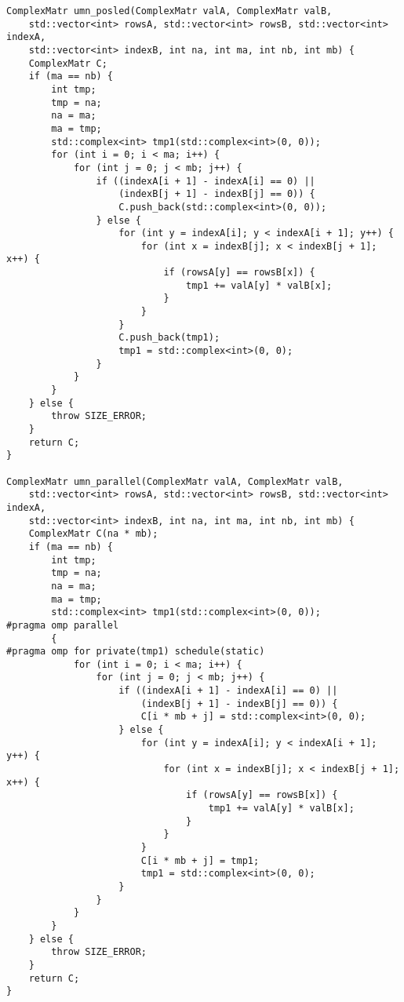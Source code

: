 \documentclass{report}
\begin{document}
\begin{lstlisting}
ComplexMatr umn_posled(ComplexMatr valA, ComplexMatr valB,
    std::vector<int> rowsA, std::vector<int> rowsB, std::vector<int> indexA,
    std::vector<int> indexB, int na, int ma, int nb, int mb) {
    ComplexMatr C;
    if (ma == nb) {
        int tmp;
        tmp = na;
        na = ma;
        ma = tmp;
        std::complex<int> tmp1(std::complex<int>(0, 0));
        for (int i = 0; i < ma; i++) {
            for (int j = 0; j < mb; j++) {
                if ((indexA[i + 1] - indexA[i] == 0) ||
                    (indexB[j + 1] - indexB[j] == 0)) {
                    C.push_back(std::complex<int>(0, 0));
                } else {
                    for (int y = indexA[i]; y < indexA[i + 1]; y++) {
                        for (int x = indexB[j]; x < indexB[j + 1]; x++) {
                            if (rowsA[y] == rowsB[x]) {
                                tmp1 += valA[y] * valB[x];
                            }
                        }
                    }
                    C.push_back(tmp1);
                    tmp1 = std::complex<int>(0, 0);
                }
            }
        }
    } else {
        throw SIZE_ERROR;
    }
    return C;
}

ComplexMatr umn_parallel(ComplexMatr valA, ComplexMatr valB,
    std::vector<int> rowsA, std::vector<int> rowsB, std::vector<int> indexA,
    std::vector<int> indexB, int na, int ma, int nb, int mb) {
    ComplexMatr C(na * mb);
    if (ma == nb) {
        int tmp;
        tmp = na;
        na = ma;
        ma = tmp;
        std::complex<int> tmp1(std::complex<int>(0, 0));
#pragma omp parallel
        {
#pragma omp for private(tmp1) schedule(static)
            for (int i = 0; i < ma; i++) {
                for (int j = 0; j < mb; j++) {
                    if ((indexA[i + 1] - indexA[i] == 0) ||
                        (indexB[j + 1] - indexB[j] == 0)) {
                        C[i * mb + j] = std::complex<int>(0, 0);
                    } else {
                        for (int y = indexA[i]; y < indexA[i + 1]; y++) {
                            for (int x = indexB[j]; x < indexB[j + 1]; x++) {
                                if (rowsA[y] == rowsB[x]) {
                                    tmp1 += valA[y] * valB[x];
                                }
                            }
                        }
                        C[i * mb + j] = tmp1;
                        tmp1 = std::complex<int>(0, 0);
                    }
                }
            }
        }
    } else {
        throw SIZE_ERROR;
    }
    return C;
}


\end{lstlisting}
\end{document}
